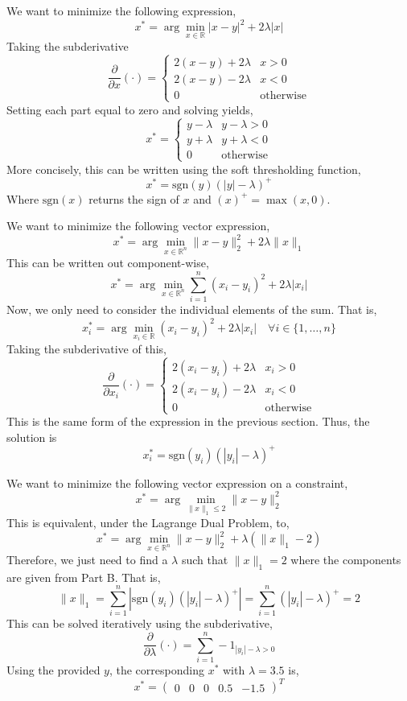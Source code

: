 \documentclass[12pt,twoside]{article}
\begin{document}
\begin{problems}
\begin{problemparts}
\problempart %

We want to minimize the following expression,
$$ x^* = \arg\min_{x \in \mathbb{R}} | x - y |^2 + 2 \lambda |x| $$
Taking the subderivative
$$ \frac{\partial}{\partial x}(\cdot) = \begin{cases}
    2(x - y) + 2\lambda & x > 0 \\
    2(x - y) - 2\lambda & x < 0 \\
    0 & \mathrm{otherwise}
\end{cases} $$
Setting each part equal to zero and solving yields,
$$ x^* = \begin{cases}
    y - \lambda & y - \lambda > 0 \\
    y + \lambda & y + \lambda < 0 \\
    0 & \mathrm{otherwise}
\end{cases} $$
More concisely, this can be written using the soft thresholding function,
$$ x^* = \mathrm{sgn}(y) (|y| - \lambda)^+ $$
Where $\mathrm{sgn}(x)$ returns the sign of $x$ and $(x)^+ = \max(x, 0)$.

\problempart %

We want to minimize the following vector expression,
$$ x^* = \arg\min_{x \in \mathbb{R}^n} \lVert x - y \rVert_2^2 + 2 \lambda 
\lVert x \rVert_1 $$
This can be written out component-wise,
$$ x^* = \arg\min_{x \in \mathbb{R}^n} \sum_{i = 1}^n (x_i - y_i)^2 + 2 \lambda 
| x_i | $$
Now, we only need to consider the individual elements of the sum. That is,
$$ x_i^* = \arg\min_{x_i \in \mathbb{R}} (x_i - y_i)^2 + 2 \lambda |x_i|\quad
\forall i \in \{1, \ldots, n\} $$
Taking the subderivative of this,
$$ \frac{\partial}{\partial x_i}(\cdot) = \begin{cases}
    2(x_i - y_i) + 2 \lambda & x_i > 0 \\
    2(x_i - y_i) - 2 \lambda & x_i < 0 \\
    0 & \mathrm{otherwise}
\end{cases} $$
This is the same form of the expression in the previous section. Thus, the 
solution is
$$ x_i^* = \mathrm{sgn}(y_i) (|y_i| - \lambda)^+ $$

\problempart %

We want to minimize the following vector expression on a constraint,
$$ x^* = \arg\min_{\lVert x \rVert_1 \leq 2} \lVert x - y \rVert_2^2 $$
This is equivalent, under the Lagrange Dual Problem, to,
$$ x^* = \arg\min_{x \in \mathbb{R}^n} \lVert x - y \rVert_2^2 + \lambda 
(\lVert x \rVert_1 - 2) $$
Therefore, we just need to find a $\lambda$ such that $\lVert x \rVert_1 = 2$ 
where the components are given from Part B. That is,
$$ \lVert x \rVert_1 = \sum_{i = 1}^n \left| \mathrm{sgn}(y_i) (|y_i| - 
\lambda)^+ \right| = \sum_{i = 1}^n (|y_i| - \lambda)^+ = 2 $$
This can be solved iteratively using the subderivative,
$$ \frac{\partial}{\partial \lambda} (\cdot) = \sum_{i = 1}^n -1_{|y_i| - 
\lambda > 0} $$
Using the provided $y$, the corresponding $x^*$  with $\lambda = 3.5$ is,
$$ x^* = \begin{pmatrix} 0 & 0 & 0 & 0.5 & -1.5 \end{pmatrix}^T $$


\end{problemparts}
\end{problems}
\end{document}
